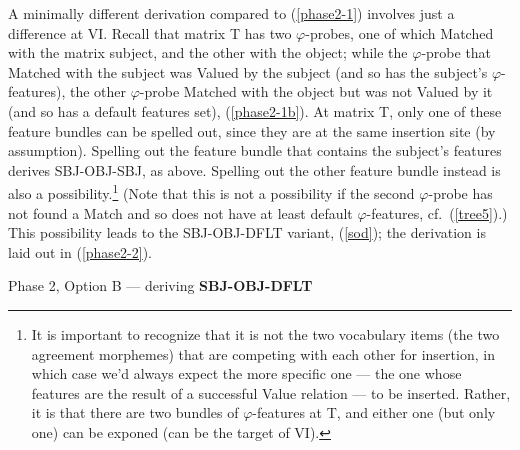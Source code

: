 \documentclass[output=paper
,modfonts
,nonflat]{langsci/langscibook}
\begin{document}
A minimally different derivation compared to (\ref{phase2-1}) involves just a difference at VI. Recall that matrix T has two $\varphi$-probes, one of which Matched with the matrix subject, and the other with the object; while the $\varphi$-probe that Matched with the subject was Valued by the subject (and so has the subject's $\varphi$-features), the other $\varphi$-probe Matched with the object but was not Valued by it (and so has a default features set), (\ref{phase2-1b}).  At matrix T, only one of these feature bundles can be spelled out, since they are at the same insertion site (by assumption). Spelling out the feature bundle that contains the subject's features derives SBJ-OBJ-SBJ, as above. Spelling out the other feature bundle instead is also a possibility.\footnote{It is important to recognize that it is not the two vocabulary items (the two agreement morphemes) that are competing with each other for insertion, in which case we'd always expect the more specific one --- the one whose features are the result of a successful Value relation --- to be inserted. Rather, it is that there are two bundles of $\varphi$-features at T, and either one (but only one) can be exponed (can be the target of VI).} (Note that this is not a possibility if the second $\varphi$-probe has not found a Match and so does not have at least default $\varphi$-features, cf.\ (\ref{tree5}).) This possibility leads to the SBJ-OBJ-DFLT variant, (\ref{sod}); the derivation is laid out in (\ref{phase2-2}).

\begin{exe}
\ex Phase 2, Option B --- deriving \textbf{SBJ-OBJ-DFLT} \label{phase2-2}
\begin{xlist}
\end{xlist}
\end{exe}
\end{document}
